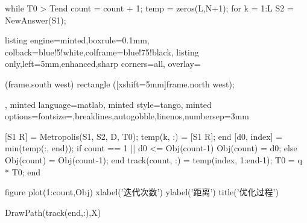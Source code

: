 \documentclass{article}
\begin{document}
\begin{homeworkProblem}
\begin{tcblisting}
while T0 > Tend
    count = count + 1;     %
    temp = zeros(L,N+1);
    for k = 1:L
        S2 = NewAnswer(S1);
    \end{tcblisting}
\begin{tcblisting}{listing engine=minted,boxrule=0.1mm,
colback=blue!5!white,colframe=blue!75!black,
listing only,left=5mm,enhanced,sharp corners=all,
overlay={\begin{tcbclipinterior} (frame.south west)
rectangle ([xshift=5mm]frame.north west);\end{tcbclipinterior}},
minted language=matlab,
minted style=tango,
minted options={fontsize=\small,breaklines,autogobble,linenos,numbersep=3mm}}
         [S1 R] = Metropolis(S1, S2, D, T0);   %
         temp(k, :) = [S1 R];            %
     end
     [d0, index] = min(temp(:, end));    %
     if count == 1 || d0 <= Obj(count-1)
         Obj(count) = d0;                    %
     else
         Obj(count) = Obj(count-1);    %
     end
     track(count, :) = temp(index, 1:end-1);  %
     T0 = q * T0;
 end
 
 figure
 plot(1:count,Obj)
 xlabel('迭代次数')
 ylabel('距离')
 title('优化过程')
 
 DrawPath(track(end,:),X)
 

\end{tcblisting}
\end{homeworkProblem}
\end{document}
